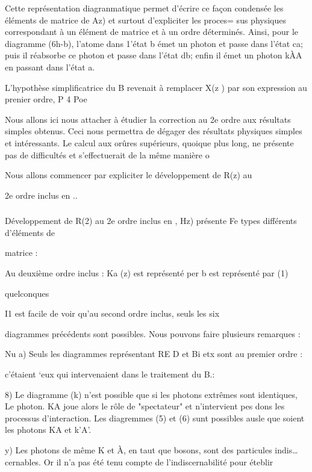 Cette représentation diagranmatique permet d'écrire ce façon
condensée les éléments de matrice de Az) et surtout d'expliciter les proces=
sus physiques correspondant à un élément de matrice et à un ordre déterminés.
Ainsi, pour le diagramme (6h-b), l'atome dans 1'état b émet un photon
et passe dans l'état ca; puis il réabsorbe ce photon et passe dans l'état
db; enfin il émet un photon kÀA en passant dans l'état a.

L'hypothèse simplificatrice du  B revenait à remplacer X(z )
par son expression au prenier ordre, P 4 Poe

Nous allons ici nous attacher à étudier la correction au 2e
ordre aux résultats simples obtenus. Ceci nous permettra de dégager des résultats physiques simples et intéressants. Le calcul aux orûres supérieurs, quoique
plus long, ne présente pas de difficultés et s'effectuerait de la même manière o

Nous allons commencer par expliciter le développement de R(z) au

2e ordre inclus en ..

\subsubsection{} Développement de R(2) au 2e ordre inclus en ,%
Hz) présente Fe types différents d'éléments de

matrice : 

Au deuxième ordre inclus : Ka
(z) est représenté per
b est représenté par (1)

quelconques

I1 est facile de voir qu'au second ordre inclus, seuls les six

diagrammes précédents sont possibles. Nous pouvons faire plusieurs remarques :

Nu
a) Seuls les diagrammes représentant RE D et Bi etx sont au premier ordre :

c'étaient ‘eux qui intervenaient dans le traitement du  B.:

8) Le diagramme (k) n'est possible que si les photons extrêmes sont identiques,
Le photon. KA joue alors le rôle de "spectateur" et n'intervient pes dons les
processus d'interaction. Les diagremmes (5) et (6) sunt possibles ausle que
soient les photons KA et k'A'.

y) Les photons de même K et À, en taut que bosons, sont des particules indis…
cernables. Or il n'a pas été tenu compte de l'indiscernabilité pour éteblir

